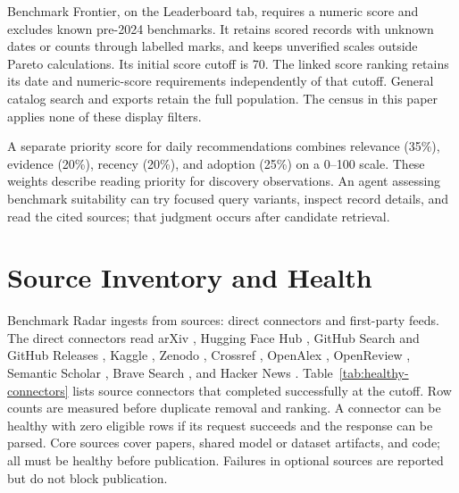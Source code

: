 \documentclass[11pt]{article}
\begin{document}
Benchmark Frontier, on the Leaderboard tab, requires a numeric score and excludes known pre-2024 benchmarks. It retains scored records with unknown dates or counts through labelled marks, and keeps unverified scales outside Pareto calculations. Its initial score cutoff is 70. The linked score ranking retains its date and numeric-score requirements independently of that cutoff. General catalog search and exports retain the full population. The census in this paper applies none of these display filters.

A separate priority score for daily recommendations combines relevance (35\%), evidence (20\%), recency (20\%), and adoption (25\%) on a 0--100 scale. These weights describe reading priority for discovery observations. An agent assessing benchmark suitability can try focused query variants, inspect record details, and read the cited sources; that judgment occurs after candidate retrieval.

\section{Source Inventory and Health}
\label{app:source-inventory}

Benchmark Radar ingests from \ReportIngestSourceCount{} sources: \ReportConnectorCount{} direct connectors and \ReportFirstPartyFeedCount{} first-party feeds. The direct connectors read arXiv \citep{arxivapi}, Hugging Face Hub \citep{huggingfacehub}, GitHub Search and GitHub Releases \citep{githubsearchdocs,githubreleasesdocs}, Kaggle \citep{kaggleapi}, Zenodo \citep{zenodoapi}, Crossref \citep{crossrefapi}, OpenAlex \citep{priem2022openalex}, OpenReview \citep{openreview}, Semantic Scholar \citep{kinney2023semanticscholar}, Brave Search \citep{bravesearchapi}, and Hacker News \citep{hnalgoliaapi}. Table~\ref{tab:healthy-connectors} lists source connectors that completed successfully at the cutoff. Row counts are measured before duplicate removal and ranking. A connector can be healthy with zero eligible rows if its request succeeds and the response can be parsed. Core sources cover papers, shared model or dataset artifacts, and code; all must be healthy before publication. Failures in optional sources are reported but do not block publication.
\end{document}
